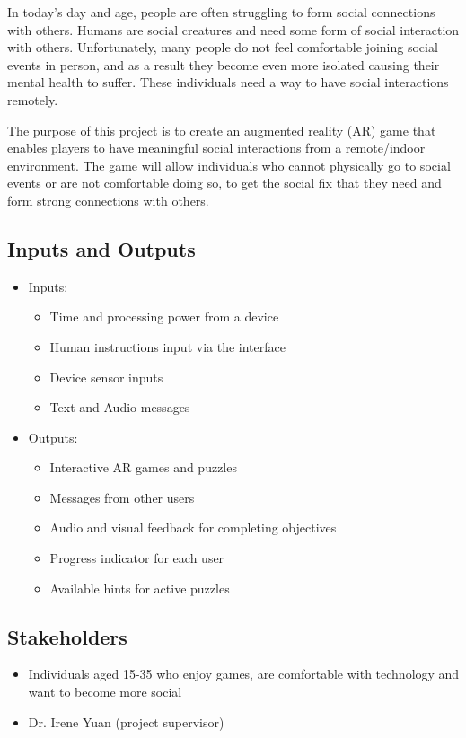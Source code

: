 \documentclass{article}
\begin{document}

In today's day and age, people are often struggling to form social connections with others. Humans are social creatures and need some form of social interaction with others. Unfortunately, many people do not feel comfortable joining social events in person, and as a result they become even more isolated causing their mental health to suffer. These individuals need a way to have social interactions remotely.

The purpose of this project is to create an augmented reality (AR) game that enables players to have meaningful social interactions from a remote/indoor environment. The game will allow individuals who cannot physically go to social events or are not comfortable doing so, to get the social fix that they need and form strong connections with others.



\subsection{Inputs and Outputs}
\begin{itemize}
    \item Inputs:
    \begin{itemize}
        \item Time and processing power from a device
        \item Human instructions input via the interface
        \item Device sensor inputs
        \item Text and Audio messages
    \end{itemize}
    \item Outputs:
    \begin{itemize}
        \item Interactive AR games and puzzles
        \item Messages from other users
        \item Audio and visual feedback for completing objectives
        \item Progress indicator for each user
        \item Available hints for active puzzles
    \end{itemize}
\end{itemize}
\subsection{Stakeholders}
\begin{itemize}
    \item Individuals aged 15-35 who enjoy games, are comfortable with technology and want to become more social
    \item Dr. Irene Yuan (project supervisor)
\end{itemize}
\end{document}

